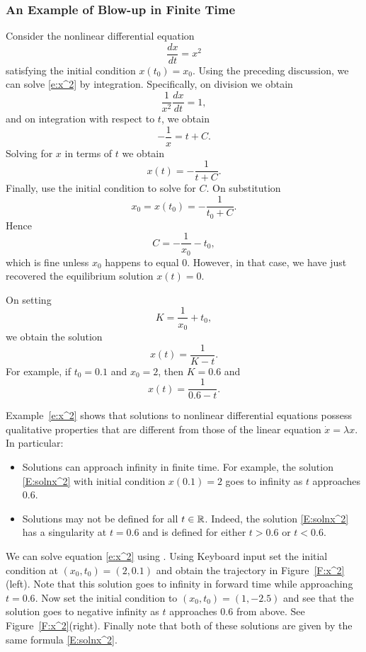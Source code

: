 \documentclass{ximera}
\begin{document}
\subsubsection*{An Example of Blow-up in Finite Time}

Consider the nonlinear differential equation
\begin{equation}  \label{e:x^2}
\frac{dx}{dt} = x^2
\end{equation}
satisfying the initial condition $x(t_0)=x_0$.  Using the preceding 
discussion, we can solve \eqref{e:x^2} by integration.  Specifically,
on division we obtain
\[
\frac{1}{x^2}\frac{dx}{dt} = 1,
\]
and on integration with respect to $t$, we obtain
\[
-\frac{1}{x} = t + C.
\]
Solving for $x$ in terms of $t$ we obtain
\[
x(t) = - \frac{1}{t+C}.
\]
Finally, use the initial condition to solve for $C$. On substitution 
\[
x_0 = x(t_0) = - \frac{1}{t_0+C}.
\]
Hence
\[
C = -\frac{1}{x_0} - t_0,
\]
which is fine unless $x_0$ happens to equal $0$.  However, in that case, we 
have just recovered the equilibrium solution $x(t)=0$.

On setting
\[
K = \frac{1}{x_0}+t_0,
\]
we obtain the solution
\[
x(t) =  \frac{1}{K-t}.
\]
For example, if $t_0=0.1$ and $x_0=2$, then $K=0.6$ and
\begin{equation} \label{E:solnx^2}
x(t) = \frac{1}{0.6-t}.
\end{equation}

Example~\eqref{e:x^2} shows that solutions to nonlinear differential
equations possess 
qualitative properties that are different from 
those of the linear equation $\dot{x}=\lambda x$.  In particular:
\begin{itemize}
\item Solutions can approach infinity in finite time.   For example, 
the solution \eqref{E:solnx^2} with initial condition $x(0.1)=2$ goes to 
infinity as $t$ approaches $0.6$.   
\item Solutions may not be defined for all $t\in\mbox{$\Bbb{R}$}$.  Indeed, the 
solution \eqref{E:solnx^2} has a singularity at $t=0.6$ and is defined 
for either $t> 0.6$ or $t<0.6$.  
\end{itemize}


We can solve equation \eqref{e:x^2} using 
{\dfield}.
Using {\sf Keyboard input} set the initial condition at
$(x_0,t_0)=(2,0.1)$ and obtain the trajectory in
Figure~\ref{F:x^2}(left).  Note that this solution goes to infinity
in forward time while approaching $t=0.6$.  Now set the initial
condition to $(x_0,t_0)=(1,-2.5)$ and see that the solution goes
to negative infinity as $t$ approaches $0.6$ from above.  See
Figure~\ref{F:x^2}(right).  Finally note that both of these
solutions are given by the same formula \eqref{E:solnx^2}.
\end{document}
